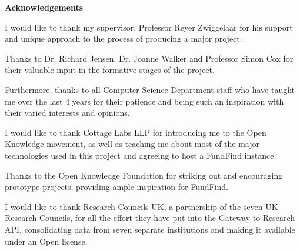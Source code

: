 \thispagestyle{empty}

\begin{center}
    {\LARGE\bf Acknowledgements}
\end{center}

I would like to thank my supervisor, Professor Reyer Zwiggelaar for his support and unique approach to the process of producing a major project.

Thanks to Dr. Richard Jensen, Dr. Joanne Walker and Professor Simon Cox for their valuable input in the formative stages of the project.

Furthermore, thanks to all Computer Science Department staff who have taught me over the last 4 years for their patience and being such an inspiration with their varied interests and opinions.

I would like to thank Cottage Labs LLP for introducing me to the Open Knowledge movement, as well as teaching me about most of the major technologies used in this project and agreeing to host a FundFind instance.

Thanks to the Open Knowledge Foundation for striking out and encouraging prototype projects, providing ample inspiration for FundFind.

I would like to thank Research Councils UK, a partnership of the seven UK Research Councils, for all the effort they have put into the Gateway to Research API, consolidating data from seven separate institutions and making it available under an Open license.
